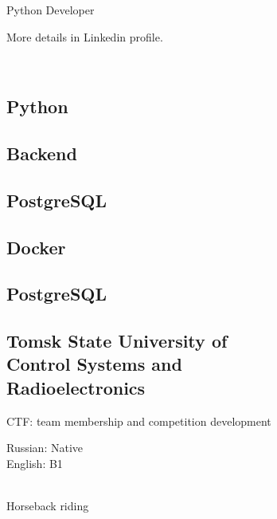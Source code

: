 \documentclass[a4paper]{MagicalCV}
\begin{document}
\lastupdated


\begin{minipage}[t]{0.33\textwidth} 


Python Developer

More details in Linkedin profile.
\sectionsep


\\


\sectionsep


\subsection{Python}
\subsection{Backend}
\subsection{PostgreSQL}
\subsection{Docker}

\subsection{PostgreSQL}


\subsection{Tomsk State University of \\ Control Systems and \\ Radioelectronics}
\vspace{\topsep} %
CTF: team membership and competition development
\sectionsep


Russian: Native\\
English: B1
\sectionsep

\\
Horseback riding
\sectionsep


\end{minipage} 
\end{document}
